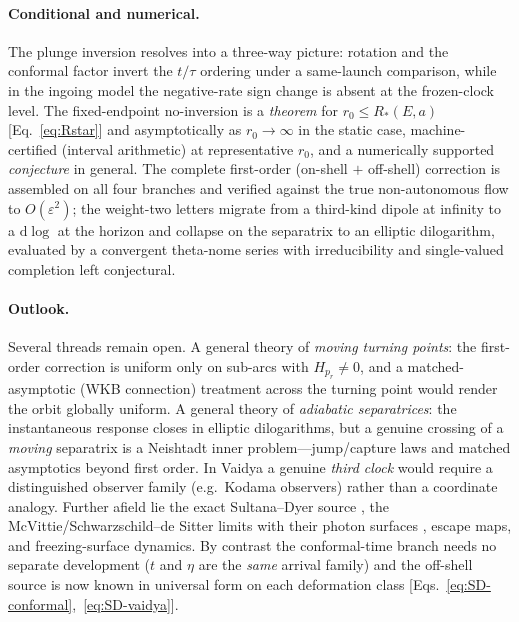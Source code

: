 \documentclass[12pt]{iopart}
\newcommand{\dd}{\mathrm{d}}
\begin{document}
\paragraph{Conditional and numerical.} The plunge inversion resolves into a three-way
picture: rotation and the conformal factor invert the $t/\tau$ ordering under a
same-launch comparison, while in the ingoing model the negative-rate sign change is
absent at the frozen-clock level. The fixed-endpoint no-inversion is a \emph{theorem}
for $r_0\le R_\ast(E,a)$ [Eq.~\eqref{eq:Rstar}] and asymptotically as $r_0\to\infty$ in
the static case, machine-certified (interval arithmetic) at representative $r_0$, and a
numerically supported \emph{conjecture} in general. The complete first-order
(on-shell $+$ off-shell) correction is assembled on all four branches and verified
against the true non-autonomous flow to $O(\varepsilon^2)$; the weight-two letters
migrate from a third-kind dipole at infinity to a $\dd\log$ at the horizon and collapse
on the separatrix to an elliptic dilogarithm, evaluated by a convergent theta-nome
series with irreducibility and single-valued completion left conjectural.

\paragraph{Outlook.} Several threads remain open. A general theory of \emph{moving
turning points}: the first-order correction is uniform only on sub-arcs with
$H_{p_r}\neq0$, and a matched-asymptotic (WKB connection) treatment across the turning
point would render the orbit globally uniform. A general theory of \emph{adiabatic
separatrices}: the instantaneous response closes in elliptic dilogarithms, but a genuine
crossing of a \emph{moving} separatrix is a Neishtadt inner problem---jump/capture laws
and matched asymptotics beyond first order. In Vaidya a genuine \emph{third clock} would
require a distinguished observer family (e.g.\ Kodama observers) rather than a coordinate
analogy. Further afield lie the exact Sultana--Dyer source \cite{SultanaDyer2005}, the
McVittie/Schwarzschild--de Sitter limits \cite{McVittie1933,Kottler1918,Kaloper2010} with
their photon surfaces \cite{ClaudelViracVirbhadra2001}, escape maps, and freezing-surface
dynamics. By contrast the conformal-time branch needs no separate development ($t$ and
$\eta$ are the \emph{same} arrival family) and the off-shell source is now known in
universal form on each deformation class
[Eqs.~\eqref{eq:SD-conformal},~\eqref{eq:SD-vaidya}].
\end{document}

